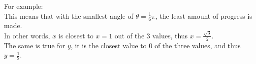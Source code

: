 \documentclass[preview]{standalone}
\begin{document}
\begin{center}
For example: \\ This means that with the smallest angle of $\theta = \frac{1}{6} \pi$, the least amount of progress is made. \\ In other words, $x$ is closest to $x=1$ out of the 3 values, thus $x = \frac{\sqrt{3}}{2}$. \\ The same is true for $y$, it is the closest value to 0 of the three values, and thus $y = \frac{1}{2}$.
\end{center}
\end{document}
